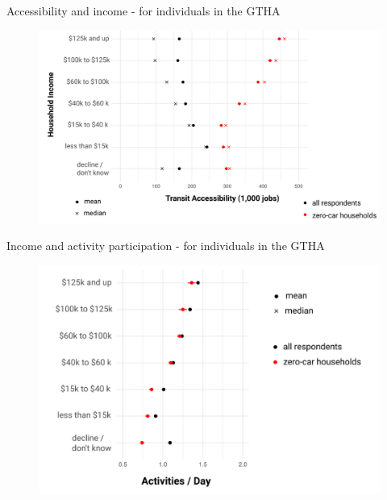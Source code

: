 \documentclass[aspectratio=169]{beamer}
\begin{document}
\begin{frame}
	
	Accessibility and income - for individuals in the GTHA
	
	\begin{figure}
		\centering
		\includegraphics[width=0.94\linewidth]{images/income_transit_gtha.png}
	\end{figure}
	
\end{frame}


\begin{frame}
	
	Income and activity participation - for individuals in the GTHA
	
	\begin{figure}
		\centering
		\includegraphics[width=0.94\linewidth]{images/income_activities_gtha.png}
	\end{figure}
	
\end{frame}
\end{document}
